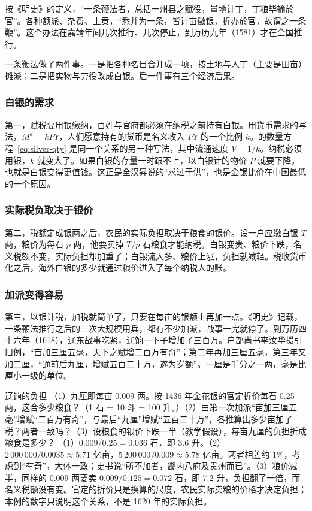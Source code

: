 按《明史》的定义，“一条鞭法者，总括一州县之赋役，量地计丁，丁粮毕输於官”。各种额派、杂费、土贡，“悉并为一条，皆计亩徵银，折办於官，故谓之一条鞭”。这个办法在嘉靖年间几次推行、几次停止，到万历九年（1581）才在全国推行\cite{mingshi}。

一条鞭法做了两件事。一是把各种名目合并成一项，按土地与人丁（主要是田亩）摊派；二是把实物与劳役改成白银。后一件事有三个经济后果。

\subsubsection{白银的需求}
第一，赋税要用银缴纳，百姓与官府都必须在纳税之前持有白银。用货币需求的写法，$M^{d}=kPY$，人们愿意持有的货币是名义收入 $PY$ 的一个比例 $k$。的数量方程~\eqref{eq:silver-qty} 是同一个关系的另一种写法，其中流通速度 $V=1/k$。纳税必须用银，$k$ 就变大了。如果白银的存量一时跟不上，以白银计的物价 $P$ 就要下降，也就是白银变得更值钱。这正是全汉昇说的“求过于供”，也是金银比价在中国最低的一个原因。

\subsubsection{实际税负取决于银价}
第二，税额定成银两之后，农民的实际负担取决于粮食的银价。设一户应缴白银 $T$ 两，粮价为每石 $p$ 两，他要卖掉 $T/p$ 石粮食才能纳税。白银变贵、粮价下跌，名义税额不变，实际负担却加重了；白银流入多、粮价上涨，负担就减轻。税收货币化之后，海外白银的多少就通过粮价进入了每个纳税人的账。

\subsubsection{加派变得容易}
第三，以银计税，加税就简单了，只要在每亩的银额上再加一点。《明史》记载，一条鞭法推行之后的三次大规模用兵，都有不少加派，战事一完就停了。到万历四十六年（1618），辽东战事吃紧，辽饷一下子增加了三百万。户部尚书李汝华援引旧例，“亩加三厘五毫，天下之赋增二百万有奇”；第二年再加三厘五毫，第三年又加二厘，“通前后九厘，增赋五百二十万，遂为岁额”\cite{mingshi}。一厘是千分之一两，毫是比厘小一级的单位。

\begin{example}{辽饷的负担}\label{ex:silver-burden}
（1）九厘即每亩 0.009 两。按 1436 年金花银的官定折价每石 0.25 两，这合多少粮食？（1 石 = 10 斗 = 100 升。）（2）由第一次加派“亩加三厘五毫”增赋“二百万有奇”，与最后“九厘”增赋“五百二十万”，各推算出多少亩加了税？两者一致吗？（3）设粮食的银价下跌一半（教学假设），每亩九厘的负担折成粮食是多少？
\solution （1）$0.009/0.25=0.036$ 石，即 3.6 升。（2）$2\,000\,000/0.0035\approx5.71$ 亿亩，$5\,200\,000/0.009\approx5.78$ 亿亩。两者相差约 1\%，考虑到“有奇”，大体一致；史书说“所不加者，畿内八府及贵州而已”。（3）粮价减半，同样的 0.009 两要卖 $0.009/0.125=0.072$ 石，即 7.2 升，负担翻了一倍，而名义税额没有变。官定的折价只是换算的尺度，农民实际卖粮的价格才决定负担；本例的数字只说明这个关系，不是 1620 年的实际负担。
\end{example}

